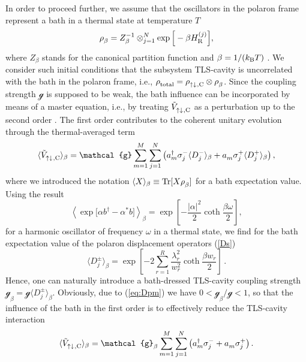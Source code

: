 \documentclass[12pt, a4paper]{iopart}
\begin{document}
In order to proceed further, we assume that the oscillators in the polaron frame represent a bath in a thermal state at temperature $T$
\begin{equation}
\rho^{}_\beta=Z_\beta^{-1}\otimes_{j=1}^N\exp\Big[-\beta H^{(j)}_{\rm R}\Big],
\end{equation}
%
where $Z_\beta$ stands for the canonical partition function and $\beta=1/(k_{\rm B} T)$ \cite{Schaller}.
We consider such initial conditions that the subsystem TLS-cavity is uncorrelated with the bath in the polaron frame, i.e., $\rho^{}_{\rm total}=\rho^{}_{\rm \uparrow\downarrow\:\!,C}\otimes\rho^{}_\beta$. Since the coupling strength $\mathcal{g}$ is supposed to be weak, the bath influence can be incorporated by means of a master equation, i.e., by treating $\tilde V^{}_{\rm \uparrow\downarrow\:\!,C}$ as a perturbation up to the second order \cite{JCP.94.4809,PRB.65.235311}. The first order contributes to the coherent unitary evolution through the thermal-averaged term
%
\begin{equation}
\langle\tilde V^{}_{\rm \uparrow\downarrow\:\!,C}\rangle_\beta = \mathcal{g}\sum_{m=1}^M\sum_{j=1}^N \left(a_m^\dag\sigma_j^-\langle D_j^-\rangle_\beta
+a_m^{}\sigma_j^+\langle D_j^+\rangle_\beta\right),
\end{equation}
%
where we introduced the notation $\langle X\rangle_\beta\equiv{\rm Tr}[X\rho^{}_\beta]$ for a bath expectation value. Using the result
%
\begin{equation}\label{eq:Davg}
\left\langle\exp\big[\alpha b^\dag-\alpha^* b\big]\right\rangle_\beta =
\exp\left[-\frac{|\alpha|^2}{2}\coth\frac{\beta\omega}{2}\right],
\end{equation}
%
for a harmonic oscillator of frequency $\omega$ in a thermal state, we find for the bath expectation value of the polaron displacement operators (\ref{Ds})
%
\begin{equation}\label{eq:Dpm}
\langle D_j^\pm\rangle_\beta = \exp\left[-2\sum_{r=1}^R\frac{\lambda_r^2}{w_r^2}
\coth\frac{\beta w_r}{2}\right]\,.
\end{equation}
%
Hence, one can naturally introduce a bath-dressed TLS-cavity coupling strength $\mathcal{g}_\beta=\mathcal{g}\langle D_j^\pm\rangle_\beta$. Obviously, due to (\ref{eq:Dpm}) we have $0<\mathcal{g}_\beta/\mathcal{g}<1$, so that the influence of the bath in the first order is to effectively reduce the TLS-cavity interaction
%
\begin{equation}\label{eq:V_A,C}
\langle\tilde V^{}_{\rm \uparrow\downarrow\:\!,C}\rangle_\beta = \mathcal{g}_\beta\sum_{m=1}^M\sum_{j=1}^N \left(a_m^\dag\sigma_j^- + a_m^{}\sigma_j^+\right).
\end{equation}
\end{document}
